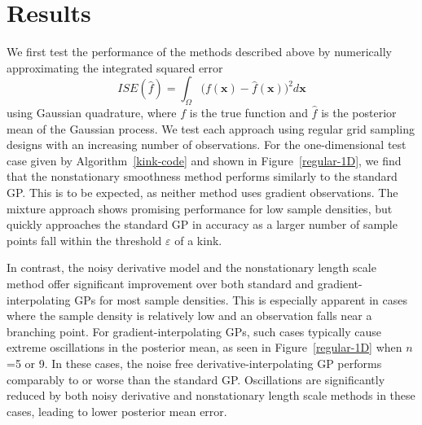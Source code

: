 \documentclass{article}
\renewcommand{\vec}[1]{\mathbf{#1}}
\begin{document}
\section{Results}

We first test the performance of the methods described above by numerically approximating the integrated squared error
$$ ISE(\hat{f}) = \int_\Omega \Big(f(\vec{x})- \hat{f}(\vec{x})\Big)^2 d\vec{x} $$
using Gaussian quadrature, where $f$ is the true function and $\hat{f}$ is the posterior mean of the Gaussian process. We test each approach using regular grid sampling designs with an increasing number of observations. For the one-dimensional test case given by Algorithm~\ref{kink-code} and shown in Figure~\ref{regular-1D}, we find that the nonstationary smoothness method performs similarly to the standard GP. This is to be expected, as neither method uses gradient observations. The mixture approach shows promising performance for low sample densities, but quickly approaches the standard GP in accuracy as a larger number of sample points fall within the threshold $\varepsilon$ of a kink.

In contrast, the noisy derivative model and the nonstationary length scale method offer significant improvement over both standard and gradient-interpolating GPs for most sample densities. This is especially apparent in cases where the sample density is relatively low and an observation falls near a branching point. For gradient-interpolating GPs, such cases typically cause extreme oscillations in the posterior mean, as seen in Figure~\ref{regular-1D} when $n$=5 or 9. In these cases, the noise free derivative-interpolating GP performs comparably to or worse than the standard GP. Oscillations are significantly reduced by both noisy derivative and nonstationary length scale methods in these cases, leading to lower posterior mean error.
\end{document}
